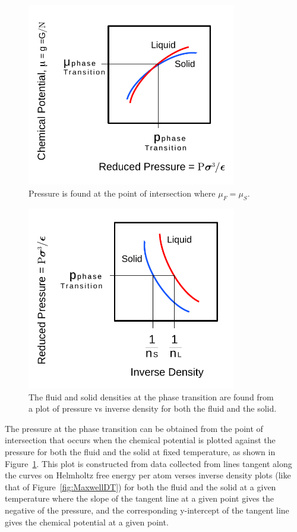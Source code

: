 \documentclass[double,12pt]{beavtex}
\begin{document}
 \begin{figure}
    \centering
     \includegraphics[height=8cm]{figs/MaxwellDTC-Fig2.pdf}
    \caption{Pressure is found at the point of intersection where $\mu_F=\mu_S$.}
    \label{fig:GibbsvsP}
  \end{figure}
  
\begin{figure}
    \centering
    \includegraphics[height=8cm]{figs/MaxwellDTC-Fig3.pdf}
    \caption{The fluid and solid densities at the phase transition are 
    found from a plot of pressure vs inverse density for both the fluid and the solid.}
    \label{fig:Pvsinvn}
  \end{figure}

The pressure at the phase transition can be obtained from the point of 
intersection that occurs when the chemical potential 
is plotted against the pressure for both the fluid and the 
solid at fixed temperature, as shown in Figure~\ref{fig:GibbsvsP}. 
This plot is constructed from data collected from lines tangent 
along the curves on Helmholtz free energy per atom verses inverse 
density plots (like that of Figure~\ref{fig:MaxwellDT}) for both the 
fluid and the solid at a given temperature where 
the slope of the tangent line at a given point gives the negative of the 
pressure, and the corresponding y-intercept of the tangent 
line gives the chemical potential at a given point. 
\end{document}

